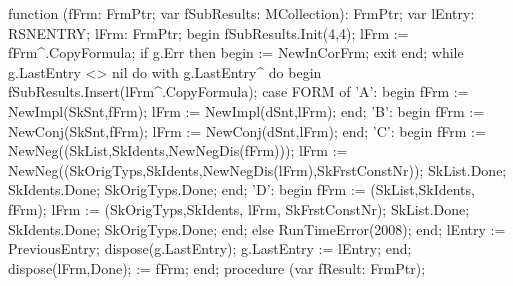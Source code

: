 function (fFrm: FrmPtr; var fSubResults: MCollection): FrmPtr;
var
   lEntry: RSNENTRY;
   lFrm: FrmPtr;
begin
   fSubResults.Init(4,4);
   lFrm := fFrm^.CopyFormula;
   if g.Err then begin  := NewInCorFrm; exit end;
   while g.LastEntry <> nil do
      with g.LastEntry^ do
   begin
      fSubResults.Insert(lFrm^.CopyFormula);
      case FORM of
         'A': begin fFrm := NewImpl(SkSnt,fFrm); lFrm := NewImpl(dSnt,lFrm); end;
         'B': begin fFrm := NewConj(SkSnt,fFrm); lFrm := NewConj(dSnt,lFrm); end;
         'C':
            begin
               fFrm := NewNeg((SkList,SkIdents,NewNegDis(fFrm)));
               lFrm := NewNeg((SkOrigTyps,SkIdents,NewNegDis(lFrm),SkFrstConstNr));
               SkList.Done; SkIdents.Done; SkOrigTyps.Done;
            end;
         'D':
            begin
               fFrm := (SkList,SkIdents, fFrm);
               lFrm := (SkOrigTyps,SkIdents, lFrm, SkFrstConstNr);
               SkList.Done; SkIdents.Done; SkOrigTyps.Done;
            end;
      else RunTimeError(2008);
      end;
      lEntry := PreviousEntry;
      dispose(g.LastEntry);
      g.LastEntry := lEntry;
   end;
   dispose(lFrm,Done);
    := fFrm;
end;
\eatline
{}\nwendcode{}\nwdocspar
\nwenddocs{}\endmoddef\nwstartdeflinemarkup{}\nwenddeflinemarkup
procedure (var fResult: FrmPtr);
